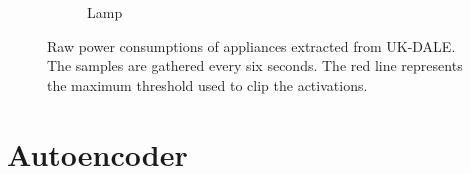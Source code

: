 \begin{figure}
\begin{subfigure}{\textwidth}
      \caption{Lamp}
      \label{fig:lamp}
    \end{subfigure}
\caption[Raw power consumptions of appliances extracted from UK-DALE]{Raw power consumptions of appliances extracted from UK-DALE. The samples are gathered every six seconds. The red line represents the maximum threshold used to clip the activations.}
\label{fig:raw_power_consumptions_uk_dale}
\end{figure}

\begin{table}
\centering
{}
\caption{Activation details for each appliance.}
\label{tab:activation_details}
\end{table}

\section{Autoencoder}

